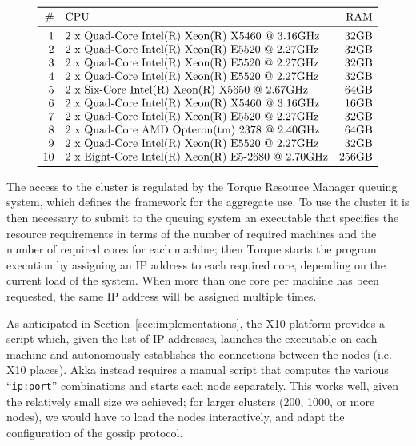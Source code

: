 \documentclass[a4paper]{article}
\numberwithin{equation}{section}
\begin{document}
{
\footnotesize
$$\begin{array}{ r l r }
\toprule
\# & \text{CPU} & \text{RAM} \\
\midrule
 1 & \text{2 x Quad-Core Intel(R) Xeon(R) X5460 @ 3.16GHz} & \text{32GB} \\
 2 & \text{2 x Quad-Core Intel(R) Xeon(R) E5520 @ 2.27GHz} & \text{32GB} \\
 3 & \text{2 x Quad-Core Intel(R) Xeon(R) E5520 @ 2.27GHz} & \text{32GB} \\
 4 & \text{2 x Quad-Core Intel(R) Xeon(R) E5520 @ 2.27GHz} & \text{32GB} \\
 5 & \text{2 x Six-Core Intel(R) Xeon(R) X5650 @ 2.67GHz} & \text{64GB} \\
 6 & \text{2 x Quad-Core Intel(R) Xeon(R) X5460 @ 3.16GHz} & \text{16GB}\\
 7 & \text{2 x Quad-Core Intel(R) Xeon(R) E5520 @ 2.27GHz} & \text{32GB}\\
 8 & \text{2 x Quad-Core AMD Opteron(tm) 2378 @ 2.40GHz} & \text{64GB} \\
 9 & \text{2 x Quad-Core Intel(R) Xeon(R) E5520 @ 2.27GHz} & \text{32GB} \\
10 & \text{2 x Eight-Core Intel(R) Xeon(R) E5-2680 @ 2.70GHz} & \text{256GB} \\
\bottomrule
\end{array}$$
}

The access to the cluster is regulated by the Torque Resource Manager
queuing system, which defines the framework for the aggregate use.
To use the cluster it is then necessary to submit to the queuing
system an executable that specifies the resource requirements in terms
of the number of required machines and the number of required cores
for each machine; then Torque 
starts the program execution by assigning an IP address to each
required core, depending on the current load of the system. 
When more than one core per machine has been requested, 
the same IP address will be assigned multiple times.

As anticipated in Section~\ref{sec:implementations}, 
the X10 platform provides a script which, given the list of IP
addresses, launches the executable on 
each machine and autonomously establishes the connections
between the nodes (i.e. X10 places). Akka instead requires a manual
script that computes the various
``\verb+ip:port+'' combinations and starts each node separately.
This works
well, given the relatively small size we achieved; for larger clusters
(200, 1000, or more nodes), we would have to load the nodes
interactively, and adapt the configuration of the gossip protocol.
\end{document}
